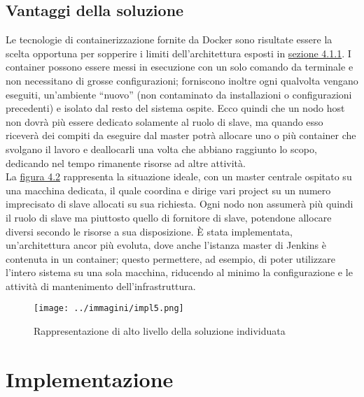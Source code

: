 \subsection{Vantaggi della soluzione}

Le tecnologie di containerizzazione fornite da Docker sono risultate essere la scelta opportuna per sopperire i limiti dell'architettura esposti in \hyperref[subsec:limiti]{sezione 4.1.1}. I \gls{container} possono essere messi in esecuzione con un solo comando da terminale e non necessitano di grosse configurazioni; forniscono inoltre ogni qualvolta vengano eseguiti, un'ambiente ``nuovo'' (non contaminato da installazioni o configurazioni precedenti) e isolato dal resto del sistema ospite. Ecco quindi che un nodo \gls{host} non dovrà più essere dedicato solamente al ruolo di \gls{slave}, ma quando esso riceverà dei compiti da eseguire dal \gls{master} potrà allocare uno o più \gls{container} che svolgano il lavoro e deallocarli una volta che abbiano raggiunto lo scopo, dedicando nel tempo rimanente risorse ad altre attività.\\

La \hyperref[fig:impl1]{figura 4.2} rappresenta la situazione ideale, con un \gls{master} centrale ospitato su una macchina dedicata, il quale coordina e dirige vari \gls{project} su un numero imprecisato di slave allocati su sua richiesta. Ogni nodo non assumerà più quindi il ruolo di \gls{slave} ma piuttosto quello di fornitore di \gls{slave}, potendone allocare diversi secondo le risorse a sua disposizione. \`E stata implementata, un'architettura ancor più evoluta, dove anche l'istanza \gls{master} di Jenkins è contenuta in un \gls{container}; questo permettere, ad esempio, di poter utilizzare l'intero sistema su una sola macchina, riducendo al minimo la configurazione e le attività di mantenimento dell'infrastruttura.

\begin{figure}[H]
    \capstart
    \centering
    \texttt{[image: ../immagini/impl5.png]}
    \caption{Rappresentazione di alto livello della soluzione individuata}
    \label{fig:impl5}
\end{figure}

\section{Implementazione}

